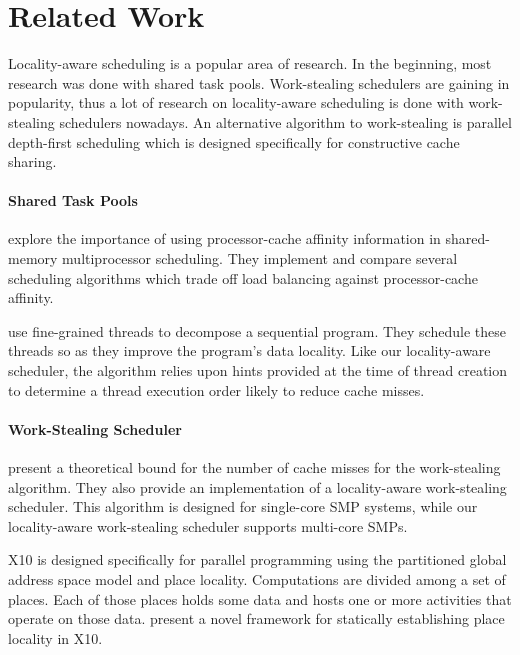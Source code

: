 
\chapter{Related Work}
\label{chap:locality-related-work}

Locality-aware scheduling is a popular area of research. In the
beginning, most research was done with shared task
pools. Work-stealing schedulers are gaining in popularity, thus a lot
of research on locality-aware scheduling is done with work-stealing
schedulers nowadays. An alternative algorithm to work-stealing is
parallel depth-first scheduling which is designed specifically for
constructive cache sharing.

\subsubsection{Shared Task Pools}

\textcite{Squillante1993} explore the importance of using
processor-cache affinity information in shared-memory multiprocessor
scheduling. They implement and compare several scheduling algorithms
which trade off load balancing against processor-cache affinity.

\textcite{Philbin1996} use fine-grained threads to decompose a
sequential program. They schedule these threads so as they improve the
program's data locality. Like our locality-aware scheduler, the
algorithm relies upon hints provided at the time of thread creation to
determine a thread execution order likely to reduce cache misses.

\subsubsection{Work-Stealing Scheduler}

\textcite{Acar2000} present a theoretical bound for the number of
cache misses for the work-stealing algorithm. They also provide an
implementation of a locality-aware work-stealing scheduler. This
algorithm is designed for single-core SMP systems, while our
locality-aware work-stealing scheduler supports multi-core SMPs.

X10 \cite{Charles2005, Saraswat2010} is designed specifically for
parallel programming using the partitioned global address space model
and place locality. Computations are divided among a set of
places. Each of those places holds some data and hosts one or more
activities that operate on those data. \textcite{Agarwal2008} present
a novel framework for statically establishing place locality in X10.

